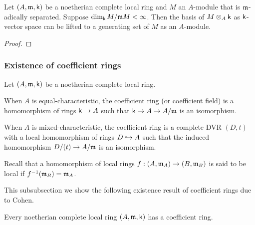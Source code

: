         \begin{proposition}\label{prop: Nakayama's Lemma for I-adically separated modules}
            Let \((A,{\mathfrak{m}},{\mathsf{k}})\) be a noetherian complete local ring and \(M\) an \(A\)-module that is \({\mathfrak{m}}\)-adically separated.
            Suppose \(\dim_{\mathsf{k}} M/{\mathfrak{m}} M < \infty\).
            Then the basis of \(M \otimes_A {\mathsf{k}}\) as \({\mathsf{k}}\)-vector space can be lifted to a generating set of \(M\) as an \(A\)-module.
        \end{proposition}
        \begin{proof}
        \end{proof}

    \subsubsection{Existence of coefficient rings}

        \begin{definition}\label{def: coefficient rings}
            Let \((A,{\mathfrak{m}},{\mathsf{k}})\) be a noetherian complete local ring.
            
            When \(A\) is equal-characteristic, the coefficient ring (or coefficient field) is a homomorphism of rings \({\mathsf{k}} \to A\) such that \({\mathsf{k}} \to A \to A/{\mathfrak{m}}\) is an isomorphism.
            
            When \(A\) is mixed-characteristic, the coefficient ring is a complete DVR \((D,t)\) with a local homomorphism of rings \(D \hookrightarrow A\) such that the induced homomorphism \(D/(t) \to A/{\mathfrak{m}}\) is an isomorphism.
        \end{definition}
        \begin{remark}
            Recall that a homomorphism of local rings \(f:(A,{\mathfrak{m}}_A) \to (B,{\mathfrak{m}}_B)\) is said to be local if \(f^{-1}({\mathfrak{m}}_B) = {\mathfrak{m}}_A\).
        \end{remark}

        This subsubsection we show the following existence result of coefficient rings due to Cohen.

        \begin{theorem}\label{thm: existence of coefficient rings}
            Every noetherian complete local ring \((A,{\mathfrak{m}},{\mathsf{k}})\) has a coefficient ring.
        \end{theorem}

